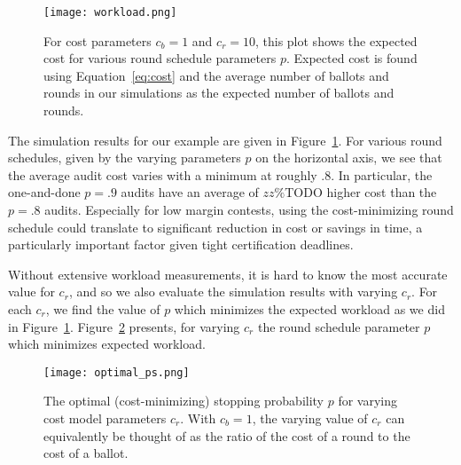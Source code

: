 \begin{figure}
\texttt{[image: workload.png]}
\caption{For cost parameters $c_b=1$ and $c_r=10$, this plot shows the expected cost for various round schedule parameters $p$. Expected cost is found using Equation~\ref{eq:cost} and the average number of ballots and rounds in our simulations as the expected number of ballots and rounds.}
\label{fig:workload}
\end{figure}

The simulation results for our example are given in Figure~\ref{fig:workload}. 
For various round schedules, given by the varying parameters $p$ on the horizontal axis, we see that the average audit cost varies with a minimum at roughly $.8$. In particular, the one-and-done $p=.9$ audits have an average of $zz\%$TODO higher cost than the $p=.8$ audits. Especially for low margin contests, using the cost-minimizing round schedule could translate to significant reduction in cost or savings in time, a particularly important factor given tight certification deadlines.

Without extensive workload measurements, it is hard to know the most accurate value for $c_r$, and so we also evaluate the simulation results with varying $c_r$. 
For each $c_r$, we find the value of $p$ which minimizes the expected workload as we did in Figure~\ref{fig:workload}. Figure~\ref{fig:optimal_ps} presents, for varying $c_r$ the round schedule parameter $p$ which minimizes expected workload. 

\begin{figure}
\texttt{[image: optimal\_ps.png]}
\caption{The optimal (cost-minimizing) stopping probability $p$ for varying cost model parameters $c_r$. With $c_b=1$, the varying value of $c_r$ can equivalently be thought of as the ratio of the cost of a round to the cost of a ballot.}
\label{fig:optimal_ps}
\end{figure}







